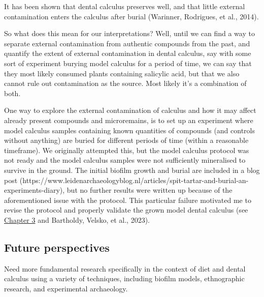 \documentclass[
  letterpaper,
]{book}
\begin{document}
It has been shown that dental calculus preserves well, and that little
external contamination enters the calculus after burial (Warinner,
Rodrigues, et al., 2014).

So what does this mean for our interpretations? Well, until we can find
a way to separate external contamination from authentic compounds from
the past, and quantify the extent of external contamination in dental
calculus, say with some sort of experiment burying model calculus for a
period of time, we can say that they most likely consumed plants
containing salicylic acid, but that we also cannot rule out
contamination as the source. Most likely it's a combination of both.

One way to explore the external contamination of calculus and how it may
affect already present compounds and microremains, is to set up an
experiment where model calculus samples containing known quantities of
compounds (and controls without anything) are buried for different
periods of time (within a reasonable timeframe). We originally attempted
this, but the model calculus protocol was not ready and the model
calculus samples were not sufficiently mineralised to survive in the
ground. The initial biofilm growth and burial are included in a blog
post
(https://www.leidenarchaeologyblog.nl/articles/spit-tartar-and-burial-an-experiments-diary),
but no further results were written up because of the aforementioned
issue with the protocol. This particular failure motivated me to revise
the protocol and properly validate the grown model dental calculus (see
\protect\hyperlink{byoc-valid}{Chapter 3} and Bartholdy, Velsko, et al.,
2023).

\hypertarget{future-perspectives}{%
\subsection{Future perspectives}\label{future-perspectives}}

Need more fundamental research specifically in the context of diet and
dental calculus using a variety of techniques, including biofilm models,
ethnographic research, and experimental archaeology.
\end{document}
